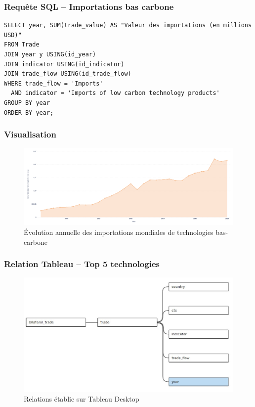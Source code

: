 \documentclass[11pt]{beamer}
\begin{document}
\begin{frame}[fragile]
  \frametitle{Requête SQL – Importations bas carbone}
  \begin{lstlisting}[style=sqlStyle, caption={Requête SQL pour les importations de technologies bas carbone}]
SELECT year, SUM(trade_value) AS "Valeur des importations (en millions USD)"
FROM Trade
JOIN year y USING(id_year)
JOIN indicator USING(id_indicator)
JOIN trade_flow USING(id_trade_flow)
WHERE trade_flow = 'Imports'
  AND indicator = 'Imports of low carbon technology products'
GROUP BY year
ORDER BY year;
  \end{lstlisting}
\end{frame}


\begin{frame}
  \frametitle{Visualisation}
  \begin{figure}
    \centering
    \includegraphics[width=1\linewidth]{./Images/Évolution_des_importations_mondiales_par_année_bas-corbone}
    \caption{Évolution annuelle des importations mondiales de technologies bas-carbone}
  \end{figure}
\end{frame}

\begin{frame}[fragile]
  \frametitle{Relation Tableau – Top 5 technologies}
  \begin{figure}
    \centering
    \includegraphics[width=1\linewidth]{./Images/jointure}
    \caption{Relations établie sur Tableau Desktop}
  \end{figure}
\end{frame}
\end{document}
